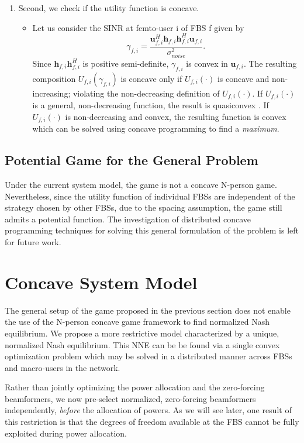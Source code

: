\begin{enumerate}
\item Second, we check if the utility function is concave.
\begin{itemize}
\item 
Let us consider the SINR at femto-user i of FBS f given by
	\begin{equation*}\label{zf_snr}
	\gamma_{f,i} = 
	\frac{\mathbf{u}^H_{f,i}\mathbf{h}_{f,i}\mathbf{h}^H_{f,i}\mathbf{u}_{f,i}}
	{\sigma^2_{noise}  
	}.
	\end{equation*}
	Since
	 $\mathbf{h}_{f,i}\mathbf{h}^H_{f,i}$ is positive semi-definite, $\gamma_{f,i}$ is convex in ${\mathbf{u}_{f,i}}$. 
	 The resulting composition $U_{f,i}(\gamma_{f,i}) $ is concave only if $U_{f,i}(\cdot) $ is concave and non-increasing; violating the non-decreasing definition of $U_{f,i}(\cdot) $.
If $U_{f,i}(\cdot) $ is a general, non-decreasing function, the result is quasiconvex \cite[p.~102]{BoV:04}. If $U_{f,i}(\cdot) $ is  non-decreasing and convex, the resulting
   function is convex which can be solved using concave programming to find a \emph{maximum}.
\end{itemize}

\end{enumerate}

\subsection{Potential Game for the General Problem}
Under the current system model, the game is not a concave N-person game. Nevertheless, since the utility function of individual FBSs are independent of the strategy chosen by other FBSs, due to the spacing assumption, the game still admits a potential function. The investigation of distributed concave programming techniques for solving this general formulation of the problem is left for future work. 

\section{Concave System Model}\label{conmodel}

The general setup of the game proposed in the previous section does not enable the use of the N-person concave game framework to find normalized Nash equilibrium. We propose a more restrictive model characterized by a unique, normalized Nash equilibrium. This NNE can be be found via a single convex optimization problem which may be solved in a distributed manner across FBSs and macro-users in the network.
\par
Rather than jointly optimizing the power allocation and the zero-forcing beamformers, we now pre-select normalized, zero-forcing beamformers independently, \emph{before} the allocation of powers.
As we will see later, one result of this restriction is that the degrees of freedom available at the FBS cannot be fully exploited during power allocation. 


